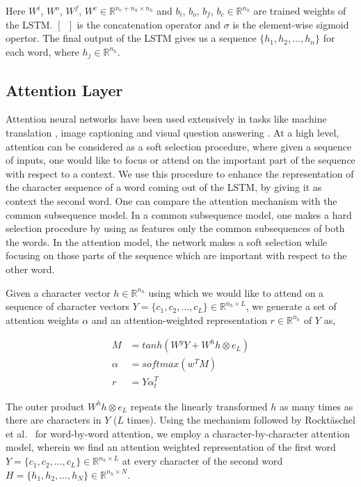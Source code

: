 \documentclass[11pt,letterpaper]{article}
\begin{document}
Here $W^i$, $W^o$, $W^f$, $W^c \in  \mathbb{R}^{n_e+n_h \times n_h}$ and $b_i$, $b_o$, $b_f$, $b_c \in \mathbb{R}^{n_h}$ are trained weights of the LSTM. $[\enspace]$ is the concatenation operator and $\sigma$ is the element-wise sigmoid opertor. The final output of the LSTM gives us a sequence $\{h_1, h_2, ..., h_n\}$ for each word, where $h_j \in \mathbb{R}^{n_h}$.

\subsection{Attention Layer}

Attention neural networks have been used extensively in tasks like machine translation \cite{mtattention}, image captioning \cite{cpattention} and visual question answering \cite{stackedattention}. At a high level, attention can be considered as a soft selection procedure, where given a sequence of inputs, one would like to focus or attend on the important part of the sequence with respect to a context. We use this procedure to enhance the representation of the character sequence of a word coming out of the LSTM, by giving it as context the second word. One can compare the attention mechanism with the common subsequence model. In a common subsequence model, one makes a hard selection procedure by using as features only the common subsequences of both the words. In the attention model, the network makes a soft selection while focusing on those parts of the sequence which are important with respect to the other word.

Given a character vector $h \in  \mathbb{R}^{n_h}$ using which we would like to attend on a sequence of character vectors $Y = \{c_1, c_2, ..., c_L\} \in \mathbb{R}^{n_h \times L}$, we generate a set of attention weights $\alpha$ and an attention-weighted representation $r \in  \mathbb{R}^{n_h}$ of $Y$ as,

\begin{align}
M &= tanh(W^yY + W^hh\otimes e_L) \\
\alpha &= softmax(w^TM) \\
r &= Y\alpha_t^T
\end{align}

The outer product $W^hh\otimes e_L$ repeats the linearly transformed $h$ as many times as there are characters in $Y$ ($L$ times). Using the mechanism followed by Rockt\"aschel et al.~ for word-by-word attention, we employ a character-by-character attention model, wherein we find an attention weighted representation of the first word $Y = \{c_1, c_2, ..., c_L\} \in \mathbb{R}^{n_h \times L}$ at every character of the second word $H = \{h_1, h_2, ..., h_N\} \in \mathbb{R}^{n_h \times N}$.
\end{document}
